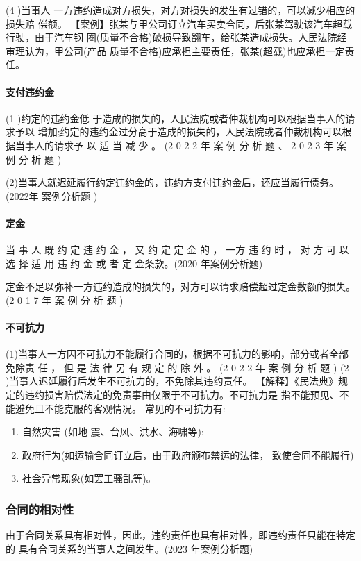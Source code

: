 \documentclass[UTF8,12pt]{ctexart}
\numberwithin{equation}{section} %
\numberwithin{figure}{section}
\numberwithin{table}{section}
\begin{document}
	(4 )当事人 一方违约造成对方损失，对方对损失的发生有过错的，可以减少相应的损失赔 偿额。
	【案例】张某与甲公司订立汽车买卖合同，后张某驾驶该汽车超载行驶，由于汽车钢 圈(质量不合格)破损导致翻车，给张某造成损失。人民法院经审理认为，甲公司(产品 质量不合格)应承担主要责任，张某(超载)也应承担一定责任。
	
	\paragraph{支付违约金}
	(1 )约定的违约金低 于造成的损失的，人民法院或者仲裁机构可以根据当事人的请求予以 增加;约定的违约金过分高于造成的损失的，人民法院或者仲裁机构可以根据当事人的请求予 以 适 当 减 少 。 (2 0 2 2 年 案 例 分 析 题 、 2 0 2 3 年 案 例 分 析 题 )
	
	 (2)当事人就迟延履行约定违约金的，违约方支付违约金后，还应当履行债务。(2022年 案例分析题 )
	
	\paragraph{定金}
	当 事 人 既 约 定 违 约 金 ， 又 约 定 定 金 的 ， 一方 违 约 时 ， 对 方 可 以 选 择 适 用 违 约 金 或 者 定 金条款。(2020 年案例分析题)
	
	定金不足以弥补一方违约造成的损失的，对方可以请求赔偿超过定金数额的损失。 (2 0 1 7 年 案 例 分 析 题 )
	
	
	\paragraph{不可抗力} 
	(1)当事人一方因不可抗力不能履行合同的，根据不可抗力的影响，部分或者全部免除责 任 ， 但 是 法 律 另 有 规 定 的 除 外 。 (2 0 2 2 年 案 例 分 析 题 )
	(2 )当事人迟延履行后发生不可抗力的，不免除其违约责任。
	【解释】《民法典》规定的违约损害赔偿法定的免责事由仅限于不可抗力。不可抗力是 指不能预见、不能避免且不能克服的客观情况。 常见的不可抗力有:
	\begin{enumerate}
		\item 自然灾害 (如地 震、台风、洪水、海啸等):
		
		\item 政府行为(如运输合同订立后，由于政府颁布禁运的法律， 致使合同不能履行)
		
		\item 社会异常现象(如罢工骚乱等)。
		
	\end{enumerate}
	
	\subsubsection{合同的相对性}
	由于合同关系具有相对性，因此，违约责任也具有相对性，即违约责任只能在特定的 具有合同关系的当事人之间发生。(2023 年案例分析题)
	
\end{document}

